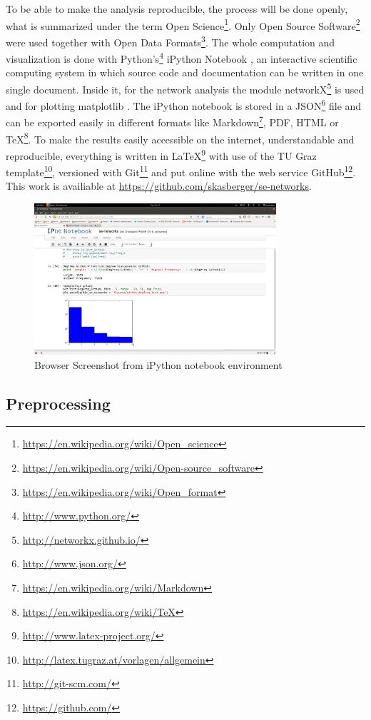 \documentclass[
a4paper,     %
12pt         %
]{scrartcl}  %
\begin{document}
To be able to make the analysis reproducible, the process will be done openly, what is summarized under the term Open Science\footnote{\url{https://en.wikipedia.org/wiki/Open_science}}. Only Open Source Software\footnote{\url{https://en.wikipedia.org/wiki/Open-source_software}} were used together with Open Data Formats\footnote{\url{https://en.wikipedia.org/wiki/Open_format}}.
The whole computation and visualization is done with Python's\footnote{\url{http://www.python.org/}} iPython Notebook \citep{PER-GRA:2007}, an interactive scientific computing system in which source code and documentation can be written in one single document. Inside it, for the network analysis the module networkX\footnote{\url{http://networkx.github.io/}} is used and for plotting matplotlib \citep{Hunter:2007}. The iPython notebook is stored in a JSON\footnote{\url{http://www.json.org/}} file and can be exported easily in different formats like Markdown\footnote{\url{https://en.wikipedia.org/wiki/Markdown}}, PDF, HTML or TeX\footnote{\url{https://en.wikipedia.org/wiki/TeX}}. To make the results easily accessible on the internet, understandable and reproducible, everything is written in LaTeX\footnote{\url{http://www.latex-project.org/}} with use of the TU Graz template\footnote{\url{http://latex.tugraz.at/vorlagen/allgemein}}, versioned with Git\footnote{\url{http://git-scm.com/}} and put online with the web service GitHub\footnote{\url{https://github.com/}}. This work is availiable at \url{https://github.com/skasberger/se-networks}.

\begin{figure}
  \centering
  \includegraphics[width=0.8\textwidth]{./images/screenshot-ipython.png}
  \caption{Browser Screenshot from iPython notebook environment}
  \label{fig:screenshot-ipython}
\end{figure}

\subsection{Preprocessing}
\label{sub:preprocessing}
\end{document}
